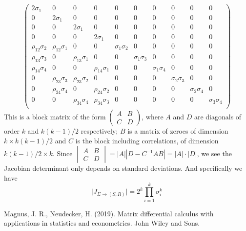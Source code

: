 \documentclass{article}
\begin{document}
$$
\begin{pmatrix}
2 \sigma_1 & 0 & 0 & 0 & 0 & 0 & 0 & 0 & 0 & 0 \\ 
0 & 2 \sigma_1 & 0 & 0 & 0 & 0 & 0 & 0 & 0 & 0 \\ 
0 & 0 & 2 \sigma_1 & 0 & 0 & 0 & 0 & 0 & 0 & 0 \\ 
0 & 0 & 0 & 2 \sigma_1 & 0 & 0 & 0 & 0 & 0 & 0 \\ 
\rho_{12} \sigma_2 & \rho_{12} \sigma_1 & 0 & 0 & \sigma_1 \sigma_2 & 0 & 0 & 0 & 0 & 0 \\
\rho_{13} \sigma_3 & 0 &\rho_{13} \sigma_1  & 0 &  0 & \sigma_1 \sigma_3 & 0 & 0 & 0 & 0 \\
\rho_{14} \sigma_4 & 0 & 0 &  \rho_{14} \sigma_1 & 0 & 0 & \sigma_1 \sigma_4 & 0 & 0 & 0  \\
0 & \rho_{23} \sigma_3 & \rho_{23} \sigma_2 & 0 & 0 & 0 & 0 & \sigma_2 \sigma_3 & 0 & 0 \\
0 & \rho_{24} \sigma_4 & 0 & \rho_{24} \sigma_2 & 0 & 0 & 0 & 0 & \sigma_2 \sigma_4 & 0 \\
0 & 0 & \rho_{34} \sigma_4 & \rho_{34} \sigma_3 & 0 & 0 & 0 & 0 & 0 & \sigma_3 \sigma_4 \\
\end{pmatrix}
$$
This is a block matrix of the form $\begin{pmatrix} A & B \\ C & D\end{pmatrix}$, where $A$ and $D$ are diagonals of order $k$ and $k(k-1)/2$ respectively; $B$ is a matrix of zeroes of dimension $k \times k(k-1)/2$ and $C$ is the block including correlations, of dimension $k(k-1)/2 \times k$. Since $\begin{vmatrix} A & B \\ C & D\end{vmatrix} = |A| |D - C^{-1}AB| = |A| \cdot |D|$,  we see the Jacobian determinant only depends on standard deviations. And specifically we have
\begin{equation}
\mid J_{\Sigma \rightarrow(S,R)}\mid = 2^k \prod_{i=1}^k \sigma_i^k
\end{equation}


\begin{thebibliography}{6}
 Magnus, J. R., Neudecker, H. (2019). Matrix differential calculus with applications in statistics and econometrics. John Wiley and Sons.
\end{thebibliography}
\end{document}

